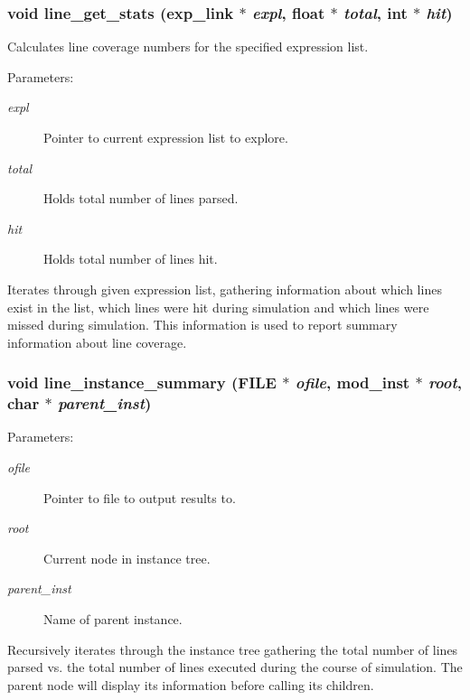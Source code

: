 \subsubsection{\setlength{\rightskip}{0pt plus 5cm}void line\_\-get\_\-stats ({\bf exp\_\-link} $\ast$ {\em expl}, float $\ast$ {\em total}, int $\ast$ {\em hit})}\label{line_8c_a2}


Calculates line coverage numbers for the specified expression list.

\begin{Desc}
\item[Parameters: ]\par
\begin{description}
\item[{\em 
expl}]Pointer to current expression list to explore. \item[{\em 
total}]Holds total number of lines parsed. \item[{\em 
hit}]Holds total number of lines hit.\end{description}
\end{Desc}
Iterates through given expression list, gathering information about which lines exist in the list, which lines were hit during simulation and which lines were missed during simulation. This information is used to report summary information about line coverage. 
\subsubsection{\setlength{\rightskip}{0pt plus 5cm}void line\_\-instance\_\-summary (FILE $\ast$ {\em ofile}, {\bf mod\_\-inst} $\ast$ {\em root}, char $\ast$ {\em parent\_\-inst})}\label{line_8c_a3}


\begin{Desc}
\item[Parameters: ]\par
\begin{description}
\item[{\em 
ofile}]Pointer to file to output results to. \item[{\em 
root}]Current node in instance tree. \item[{\em 
parent\_\-inst}]Name of parent instance.\end{description}
\end{Desc}
Recursively iterates through the instance tree gathering the total number of lines parsed vs. the total number of lines executed during the course of simulation. The parent node will display its information before calling its children. 
